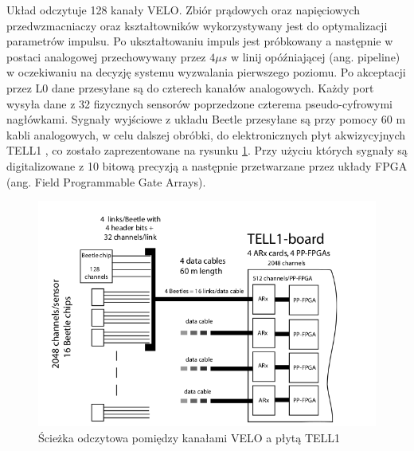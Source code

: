 Układ odczytuje 128 kanały VELO. Zbiór prądowych oraz napięciowych przedwzmacniaczy oraz kształtowników wykorzystywany jest do optymalizacji parametrów impulsu. 
Po ukształtowaniu impuls jest próbkowany a następnie w postaci analogowej przechowywany przez $4\mu s$ w linij opóźniającej (ang. pipeline) w oczekiwaniu na decyzję systemu wyzwalania pierwszego poziomu. Po akceptacji przez L0 dane przesyłane są do czterech kanałów analogowych. Każdy port wysyła dane z 32 fizycznych sensorów poprzedzone czterema pseudo-cyfrowymi nagłówkami.
Sygnały wyjściowe z układu Beetle przesyłane są przy pomocy 60 m kabli analogowych, w celu dalszej obróbki, do elektronicznych płyt akwizycyjnych TELL1 \cite{Aras}, co zostało zaprezentowane na rysunku \ref{sciezka}. Przy użyciu których sygnały są digitalizowane z 10 bitową precyzją a następnie przetwarzane przez układy FPGA (ang. Field Programmable Gate Arrays). 
\begin{figure}[ht]
 \centering
 \includegraphics[scale=0.9]{rozdzial2/Velo_schematic.png}
 \caption{Ścieżka odczytowa pomiędzy kanałami VELO a płytą TELL1\cite{Aras}}
 \label{sciezka}
\end{figure}





